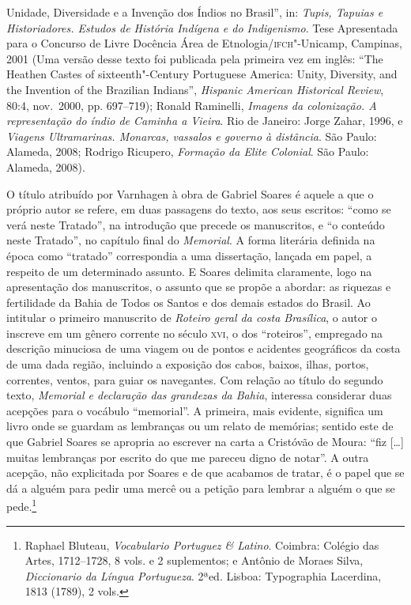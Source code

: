 {Unidade, Diversidade e a Invenção dos Índios no Brasil'', in:
\textit{Tupis, Tapuias e Historiadores. Estudos de História Indígena e
do Indigenismo}. Tese Apresentada para o Concurso de Livre
Docência Área de Etnologia/\textsc{ifch}"-Unicamp, Campinas, 2001 (Uma
versão desse texto foi publicada pela primeira vez em inglês: “The
Heathen Castes of sixteenth"-Century Portuguese America: Unity,
Diversity, and the Invention of the Brazilian Indians”,
\textit{Hispanic American Historical Review}, 80:4, nov.~2000, pp.
697--719); Ronald Raminelli, \textit{Imagens da colonização. A
representação do índio de Caminha a Vieira}. Rio de Janeiro:
Jorge Zahar, 1996, e \textit{Viagens Ultramarinas. Monarcas, vassalos e
governo à distância}. São Paulo: Alameda, 2008; Rodrigo Ricupero,
\textit{Formação da Elite Colonial}. São Paulo: Alameda, 2008).}

O título atribuído por Varnhagen à obra de Gabriel Soares é aquele a que 
o próprio autor se refere, em duas passagens do texto, aos seus
escritos: “como se verá neste Tratado”, na introdução que precede os
manuscritos, e “o conteúdo neste Tratado”, no capítulo final do
\textit{Memorial}.  A forma literária definida na época como “tratado”
correspondia a uma dissertação, lançada em papel, a respeito de um
determinado assunto. E Soares delimita claramente, logo na apresentação
dos manuscritos, o assunto que se propõe a abordar: as riquezas e
fertilidade da Bahia de Todos os Santos e dos demais estados do Brasil.
Ao intitular o primeiro manuscrito de \textit{Roteiro geral da costa Brasílica}, o autor o inscreve em um gênero corrente no
século \textsc{xvi}, o dos “roteiros”, empregado na descrição minuciosa de uma
viagem ou de pontos e acidentes geográficos da costa de uma dada
região, incluindo a exposição dos cabos, baixos, ilhas, portos,
correntes, ventos, para guiar os navegantes. Com relação ao título do
segundo texto, \textit{Memorial e declaração das grandezas da Bahia}, 
interessa considerar duas acepções para o vocábulo “memorial”. A
primeira, mais evidente, significa um livro onde se guardam as
lembranças ou um relato de memórias; sentido este de que Gabriel Soares
se apropria ao escrever na carta a Cristóvão de Moura: “fiz [\ldots]
muitas lembranças por escrito do que me pareceu digno de notar”. A
outra acepção, não explicitada por Soares e de que acabamos de tratar,
é o papel que se dá a alguém para pedir uma mercê ou a petição para
lembrar a alguém o que se pede.\footnote{ Raphael Bluteau,
\textit{Vocabulario Portuguez \& Latino}. Coimbra: Colégio das Artes,
1712--1728, 8 vols. e 2 suplementos; e Antônio de Moraes Silva,
\textit{Diccionario da Língua Portugueza}. 2ªed. Lisboa: Typographia
Lacerdina, 1813 (1789), 2 vols.} 

